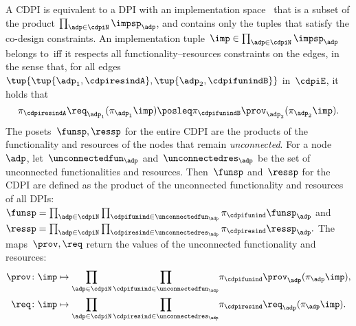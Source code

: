 A CDPI is equivalent to a DPI with an implementation space~\impsp
that is a subset of the product $\prod_{\adp\in\cdpiN}\impsp_{\adp}$,
and contains only the tuples that satisfy the co-design constraints.
An implementation tuple~$\imp\in\prod_{\adp\in\cdpiN}\impsp_{\adp}$
belongs to~\impsp iff it respects all functionality--resources
constraints on the edges, in the sense that, for all edges~$\tup{\tup{ \adp_1,\cdpiresindA} ,\tup{\adp_2,\cdpifunindB}}$
in~$\cdpiE$, it holds that
\begin{equation*}
    \pi_{\cdpiresindA}\req_{\adp_1}(\pi_{\adp_1}\imp)\posleq\pi_{\cdpifunindB}\prov_{\adp_2}(\pi_{\adp_2}\imp).
\end{equation*}
The posets~$\funsp,\ressp$ for the entire CDPI are the products
of the functionality and resources of the nodes that remain \emph{unconnected}.
For a node~$\adp$, let~$\unconnectedfun_{\adp}$ and~$\unconnectedres_{\adp}$
be the set of unconnected functionalities and resources.
Then~$\funsp$ and~$\ressp$ for the CDPI are defined as the product of the unconnected functionality and resources of all DPIs:
~$\funsp=\prod_{\adp\in\cdpiN}\prod_{\cdpifunind\in\unconnectedfun_{\adp}}\pi_{\cdpifunind}\funsp_{\adp}$
and~$\ressp=\prod_{\adp\in\cdpiN}\prod_{\cdpiresind\in\unconnectedres_{\adp}}\pi_{\cdpiresind}\ressp_{\adp}.$
The maps~$\prov,\req$ return the values of the unconnected functionality
and resources:
\begin{equation*}
    \begin{aligned}
        \prov\colon \imp & \mapsto{\scriptstyle {\displaystyle \prod_{\adp\in\cdpiN}\prod_{\cdpifunind\in\unconnectedfun_{\adp}}}}\pi_{\cdpifunind}\prov_{\adp}(\pi_{\adp}\imp),\\
        \req\colon \imp & \mapsto{\displaystyle \prod_{\adp\in\cdpiN}\prod_{\cdpiresind\in\unconnectedres_{\adp}}}\pi_{\cdpiresind}\req_{\adp}(\pi_{\adp}\imp).
    \end{aligned}
\end{equation*}



